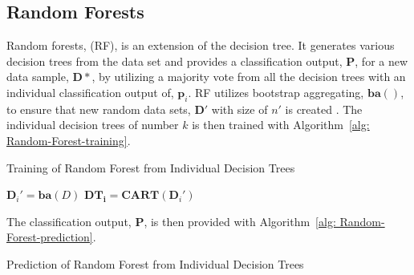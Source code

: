 \subsection{Random Forests}
Random forests, (RF), is an extension of the decision tree. It generates various decision trees from the data set and provides a classification output, $\mathbf{P}$, for a new data sample, $\mathbf{D}*$, by utilizing a majority vote from all the decision trees with an individual classification output of, $\mathbf{p}_i$. RF utilizes bootstrap aggregating, $\mathbf{ba}()$, to ensure that new random data sets, $\mathbf{D}'$ with size of $n'$ is created \cite{Primartha2018, Paul2018, Shi2006}. The individual decision trees of number $k$ is then trained with Algorithm~\ref{alg: Random-Forest-training}.

\begin{algorithm}[!htb]
	\caption[Random Forest]{Training of Random Forest from Individual Decision Trees}
	\label{alg: Random-Forest-training}
	\begin{algorithmic}[1]
		\State \texttt{$\mathbf{D}_i' = \mathbf{ba}(D)$}
		\State \texttt{$\mathbf{DT_i} = \mathbf{CART}(\mathbf{D}_i')$}
		\EndFor
	\end{algorithmic}
\end{algorithm}
The classification output, $\mathbf{P}$, is then provided with Algorithm~\ref{alg: Random-Forest-prediction}.
\begin{algorithm}[!htb]
	\caption[Random Forest]{Prediction of Random Forest from Individual Decision Trees}
	\label{alg: Random-Forest-prediction}
	\begin{algorithmic}[1]
	\State \texttt{$\mathbf{p}_i = \mathbf{DT_i}(\mathbf{D}*)$}
	\EndFor
	\State $\mathbf{P} = \textbf{mode}(\mathbf{p})}$
	\end{algorithmic}
\end{algorithm}


